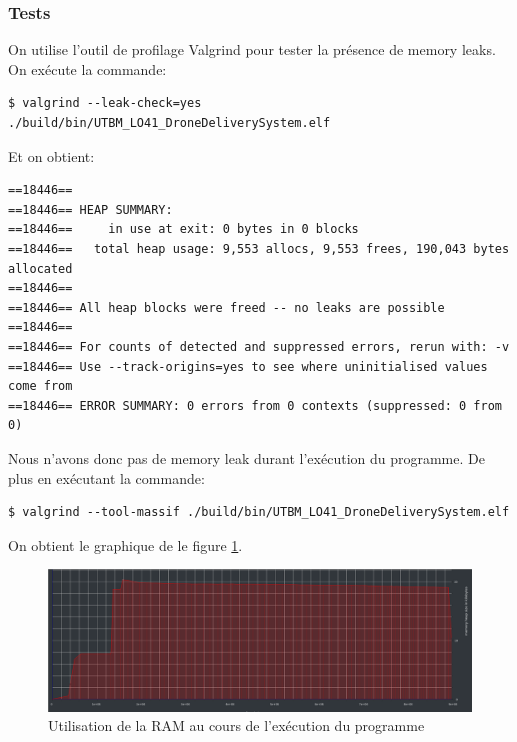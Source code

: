 \documentclass[article, backcover, french, nodocumentinfo]{upmethodology-document}
\begin{document}
			\subsubsection{Tests}
					On utilise l’outil de profilage Valgrind pour tester la présence de memory leaks.\\
					On exécute la commande:
					\begin{lstlisting}[breaklines=true,breakatwhitespace=true,breakindent=0pt,columns=fixed,keepspaces=true,frame=single,basicstyle=\footnotesize\sffamily]
$ valgrind --leak-check=yes ./build/bin/UTBM_LO41_DroneDeliverySystem.elf\end{lstlisting}
					Et on obtient:
					\begin{lstlisting}[breaklines=true,breakatwhitespace=true,breakindent=0pt,columns=fixed,keepspaces=true,frame=single,basicstyle=\footnotesize\sffamily]
==18446==
==18446== HEAP SUMMARY:
==18446==     in use at exit: 0 bytes in 0 blocks
==18446==   total heap usage: 9,553 allocs, 9,553 frees, 190,043 bytes allocated
==18446==
==18446== All heap blocks were freed -- no leaks are possible
==18446==
==18446== For counts of detected and suppressed errors, rerun with: -v
==18446== Use --track-origins=yes to see where uninitialised values come from
==18446== ERROR SUMMARY: 0 errors from 0 contexts (suppressed: 0 from 0)\end{lstlisting}
					Nous n'avons donc pas de memory leak durant l'exécution du programme.
					De plus en exécutant la commande:
					\begin{lstlisting}[breaklines=true,breakatwhitespace=true,breakindent=0pt,columns=fixed,keepspaces=true,frame=single,basicstyle=\footnotesize\sffamily]
$ valgrind --tool-massif ./build/bin/UTBM_LO41_DroneDeliverySystem.elf \end{lstlisting}
					On obtient le graphique de le figure \ref{fig:MemoryUsage}.
					\begin{figure}[H]
						\centering
						\includegraphics[width=\textwidth]{figures/memory}
						\caption{Utilisation de la RAM au cours de l'exécution du programme}
						\label{fig:MemoryUsage}
					\end{figure}
\end{document}
